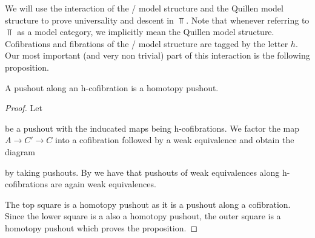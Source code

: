 We will use the interaction of the \Strom/ model structure and the Quillen model structure to prove universality and descent in $\Top$.
Note that whenever referring to $\Top$ as a model category, we implicitly mean the Quillen model structure. 
Cofibrations and fibrations of the \Strom/ model structure are tagged by the letter $h$.
Our most important (and very non trivial) part of this interaction is the following proposition.
\begin{prop}\label{prop:poAlongHCofibIsHtpyPo}
    A pushout along an h-cofibration is a homotopy pushout.
    \begin{proof}
        Let
        \begin{center}
        \end{center}
        be a pushout with the inducated maps being h-cofibrations.
        We factor the map $A\to C'\to C$ into a cofibration followed by a weak equivalence and obtain the diagram
        \begin{center}
        \end{center}
        by taking pushouts.
        By \cite[Proposition 1.1]{hcolim_bar} we have that pushouts of weak equivalences along h-cofibrations are again weak equivalences.

        The top square is a homotopy pushout as it is a pushout along a cofibration. 
        Since the lower square is a also a homotopy pushout, the outer square is a homotopy pushout which proves the proposition.
    \end{proof}
\end{prop}
